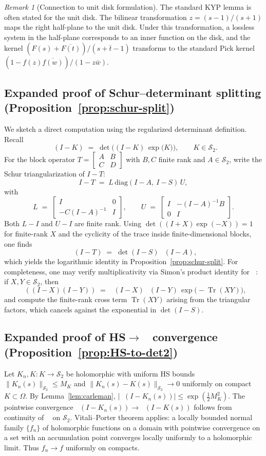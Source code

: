 \documentclass[11pt]{article}
\theoremstyle{remark}
\newtheorem{remark}[theorem]{Remark}
\newcommand{\C}{\mathbb{C}}
\newcommand{\HS}{\mathcal{S}_2}
\DeclareMathOperator{\Tr}{Tr}
\DeclareMathOperator{\dettwo}{det_2}
\begin{document}
\begin{remark}[Connection to unit disk formulation]
The standard KYP lemma is often stated for the unit disk. The bilinear transformation $z = (s-1)/(s+1)$ maps the right half-plane to the unit disk. Under this transformation, a lossless system in the half-plane corresponds to an inner function on the disk, and the kernel $(F(s) + \overline{F(t)})/(s + \bar t - 1)$ transforms to the standard Pick kernel $(1 - f(z)\overline{f(w)})/(1 - z\bar w)$.
\end{remark}

\subsection{Expanded proof of Schur--determinant splitting (Proposition~\ref{prop:schur-split})}
We sketch a direct computation using the regularized determinant definition. Recall
\[
 \dettwo(I-K)\;=\;\det\!\Big((I-K)\,\exp\big(K\big)\Big),\qquad K\in\HS.
\]
For the block operator \(T=\begin{bmatrix}A&B\\C&D\end{bmatrix}\) with \(B,C\) finite rank and \(A\in\HS\), write the Schur triangularization of \(I-T\):
\[
 I-T\;=\;L\,\mathrm{diag}(I-A,\ I-S)\,U,
\]
with
\[
 L\;=\;\begin{bmatrix}I & 0\\ -C(I-A)^{-1} & I\end{bmatrix},\qquad U\;=\;\begin{bmatrix}I & -(I-A)^{-1}B\\ 0 & I\end{bmatrix}.
\]
Both \(L-I\) and \(U-I\) are finite rank. Using \(\det((I+X)\exp(-X))=1\) for finite-rank \(X\) and the cyclicity of the trace inside finite-dimensional blocks, one finds
\[
 \dettwo(I-T)\;=\;\det(I-S)\,\dettwo(I-A),
\]
which yields the logarithmic identity in Proposition~\ref{prop:schur-split}. For completeness, one may verify multiplicativity via Simon's product identity for \(\dettwo\): if \(X,Y\in\HS\), then
\[
 \dettwo((I-X)(I-Y))\;=\;\dettwo(I-X)\,\dettwo(I-Y)\,\exp\!\big(-\Tr(XY)\big),
\]
and compute the finite-rank cross term \(\Tr(XY)\) arising from the triangular factors, which cancels against the exponential in \(\det(I-S)\).

\subsection{Expanded proof of HS\(\to\)\(\dettwo\) convergence (Proposition~\ref{prop:HS-to-det2})}
Let \(K_n,K:K\to\HS\) be holomorphic with uniform HS bounds \(\|K_n(s)\|_{\HS}\le M_K\) and \(\|K_n(s)-K(s)\|_{\HS}\to 0\) uniformly on compact \(K\subset\Omega\). By Lemma~\ref{lem:carleman}, \(|\dettwo(I-K_n(s))|\le \exp(\tfrac12 M_K^2)\). The pointwise convergence \(\dettwo(I-K_n(s))\to \dettwo(I-K(s))\) follows from continuity of \(\dettwo\) on \(\HS\). Vitali--Porter theorem applies: a locally bounded normal family \(\{f_n\}\) of holomorphic functions on a domain with pointwise convergence on a set with an accumulation point converges locally uniformly to a holomorphic limit. Thus \(f_n\to f\) uniformly on compacts.
\end{document}
